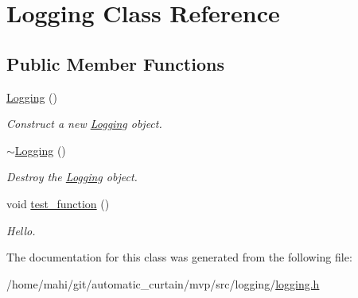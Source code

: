 \hypertarget{classLogging}{}\section{Logging Class Reference}
\label{classLogging}
\subsection*{Public Member Functions}
\begin{DoxyCompactItemize}
\item 
\mbox{\label{classLogging_acc3d848a3d05076fd185cd95e9c648d5}} 
\hyperlink{classLogging_acc3d848a3d05076fd185cd95e9c648d5}{Logging} ()
\begin{DoxyCompactList}\small\item\em Construct a new \hyperlink{classLogging}{Logging} object. \end{DoxyCompactList}\item 
\mbox{\label{classLogging_af6a0971121f5b0d9d6ebfb4e69b20a4d}} 
\hyperlink{classLogging_af6a0971121f5b0d9d6ebfb4e69b20a4d}{$\sim$\+Logging} ()
\begin{DoxyCompactList}\small\item\em Destroy the \hyperlink{classLogging}{Logging} object. \end{DoxyCompactList}\item 
\mbox{\label{classLogging_a28ee228e8bf5b417af58a8d2c4d2ce10}} 
void \hyperlink{classLogging_a28ee228e8bf5b417af58a8d2c4d2ce10}{test\+\_\+function} ()
\begin{DoxyCompactList}\small\item\em Hello. \end{DoxyCompactList}\end{DoxyCompactItemize}


The documentation for this class was generated from the following file\+:\begin{DoxyCompactItemize}
\item 
/home/mahi/git/automatic\+\_\+curtain/mvp/src/logging/\hyperlink{logging_8h}{logging.\+h}\end{DoxyCompactItemize}

